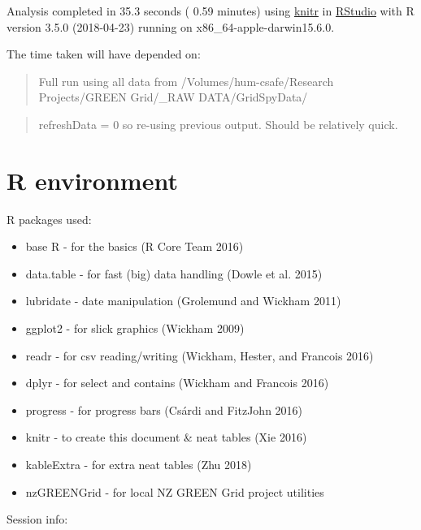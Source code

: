 \documentclass[]{article}
\providecommand{\tightlist}{%
  \setlength{\itemsep}{0pt}\setlength{\parskip}{0pt}}
\begin{document}
Analysis completed in 35.3 seconds ( 0.59 minutes) using
\href{https://cran.r-project.org/package=knitr}{knitr} in
\href{http://www.rstudio.com}{RStudio} with R version 3.5.0 (2018-04-23)
running on x86\_64-apple-darwin15.6.0.

The time taken will have depended on:

\begin{quote}
Full run using all data from /Volumes/hum-csafe/Research Projects/GREEN
Grid/\_RAW DATA/GridSpyData/
\end{quote}

\begin{quote}
refreshData = 0 so re-using previous output. Should be relatively quick.
\end{quote}

\section{R environment}\label{r-environment}

R packages used:

\begin{itemize}
\tightlist
\item
  base R - for the basics (R Core Team 2016)
\item
  data.table - for fast (big) data handling (Dowle et al. 2015)
\item
  lubridate - date manipulation (Grolemund and Wickham 2011)
\item
  ggplot2 - for slick graphics (Wickham 2009)
\item
  readr - for csv reading/writing (Wickham, Hester, and Francois 2016)
\item
  dplyr - for select and contains (Wickham and Francois 2016)
\item
  progress - for progress bars (Csárdi and FitzJohn 2016)
\item
  knitr - to create this document \& neat tables (Xie 2016)
\item
  kableExtra - for extra neat tables (Zhu 2018)
\item
  nzGREENGrid - for local NZ GREEN Grid project utilities
\end{itemize}

Session info:
\end{document}
